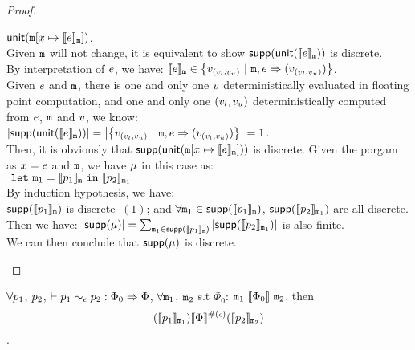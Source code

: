 \documentclass[a4paper,11pt]{article}
\begin{document}
\begin{proof}
\begin{itemize}
	$\mathsf{unit}(\mathtt{m}[x \mapsto \llbracket e \rrbracket_{\mathtt{m}}])$.
	\\
	Given $\mathtt{m}$ will not change, it is equivalent to show 
	$\mathsf{supp}(\mathsf{unit}(\llbracket e \rrbracket_{\mathtt{m}}))$ is discrete.
	\\
	By interpretation of $e$, we have: 
	$\llbracket e \rrbracket_{\mathtt{m}} \in  
	\big\{v_{(v_{l}, v_{u})} ~|~
	\mathtt{m},  
	e \Rightarrow (v_{(v_{l}, v_{u})})\big\}$.
	\\
	Given $e$ and $\mathtt{m}$, 
	there is one and only one $v$ deterministically evaluated in floating point computation, and one and only one $(v_{l}, v_{u})$ deterministically computed from $e$, $\mathtt{m}$ and $v$, we know:
	\\
	$\left \vert \mathsf{supp}(\mathsf{unit}(\llbracket e \rrbracket_{\mathtt{m}})) \right \vert  
	= 
	\left \vert \big\{v_{(v_{l}, v_{u})} ~|~
		\mathtt{m},  
		e \Rightarrow (v_{(v_{l}, v_{u})})\big\} \right \vert  = 1$.
	\\
		Then, it is obviously that $\mathsf{supp}(\mathsf{unit}(\mathtt{m}[x \mapsto \llbracket e \rrbracket_{\mathtt{m}}]))$ is discrete.
	Given the porgam as $x = e$ and $\mathtt{m}$, 
	we have $\mu$ in this case as:
	\\
	$~\mathtt{let}~  \mathtt{m}_1 = 
	 	\llbracket p_1 \rrbracket_{\mathtt{m}} ~\mathtt{in}~
	 	\llbracket p_2 \rrbracket_{\mathtt{m}_1}$ 
	 \\
	 By induction hypothesis, we have:
	 \\
	 $\mathsf{supp}(\llbracket p_1 \rrbracket_{\mathtt{m}})$ is discrete $~(1)$; and 
	 $\forall \mathtt{m}_1 \in \mathsf{supp}(\llbracket p_1 \rrbracket_{\mathtt{m}})$, $\mathsf{supp}(\llbracket p_2 \rrbracket_{\mathtt{m}_1})$ are all discrete.
	 \\
	 Then we have: $\left \vert \mathsf{supp}(\mu) \right \vert = \sum_{\mathtt{m}_1 \in \mathsf{supp}(\llbracket p_1 \rrbracket_{\mathtt{m}})} \left \vert \mathsf{supp}(\llbracket p_2 \rrbracket_{\mathtt{m}_1}) \right \vert$ is also finite.
	 \\
	 We can then conclude that $\mathsf{supp}(\mu)$ is discrete.
\end{itemize}
\end{proof}
%
\clearpage
\begin{thm}[Soundness]
 $\forall p_1$, $p_2$,  $ \vdash p_1	
\sim_{\epsilon} 
p_2 :
\Phi_0 \Rightarrow \Phi $,    $\forall \mathtt{m}_1$, $\mathtt{m}_2$ 
s.t $\Phi_0$: 
$\mathtt{m}_1 ~ \llbracket \Phi_0 \rrbracket ~ \mathtt{m}_2$,
then
$$ 
(\llbracket p_1 \rrbracket_{\mathtt{m}_1})  
\llbracket \Phi \rrbracket^{\#(\epsilon)} 
(\llbracket p_2 \rrbracket_{\mathtt{m}_2}) 
$$.
\end{thm}
%
%
%
\end{document}

